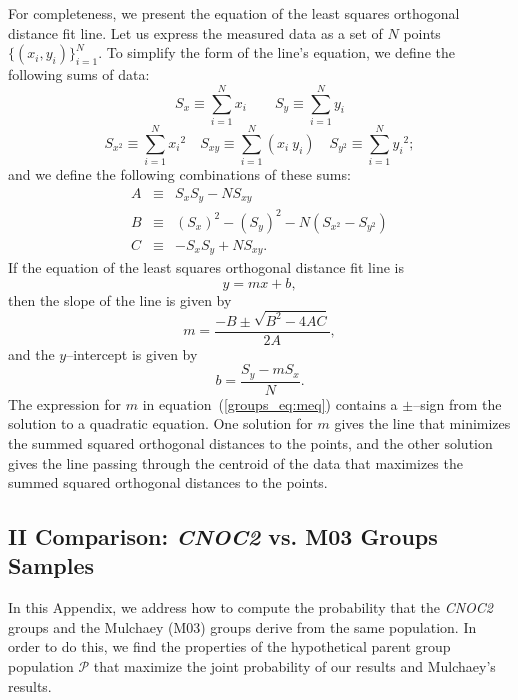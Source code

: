 For completeness, we present the equation of the least squares
orthogonal distance fit line.  Let us express the measured data as a
set of $N$ points $\{(x_i, y_i)\}_{i=1}^N$.  To simplify the form of
the line's equation, we define the following sums of data:
\[
S_x \equiv \sum_{i=1}^N x_i \qquad S_y \equiv \sum_{i=1}^N y_i
\]
\begin{equation}
\label{groups_eq:sums} S_{x^2} \equiv \sum_{i=1}^N {x_i}^2
 \quad S_{xy}  \equiv \sum_{i=1}^N (x_i \: y_i)
 \quad S_{y^2} \equiv \sum_{i=1}^N {y_i}^2;
\end{equation}
and we define the following combinations of these sums:
\begin{eqnarray}
\nonumber      A & \equiv & S_x S_y - NS_{xy}\\
\nonumber      B & \equiv & (S_x)^2 - (S_y)^2 - N(S_{x^2}-S_{y^2})\\
\label{groups_eq:ABC} C & \equiv & - S_x S_y + NS_{xy}.
\end{eqnarray}
If the equation of the least squares orthogonal distance fit line is
\begin{equation}
y = m x + b,
\label{groups_eq:basiclineeq}
\end{equation}
then the slope of the line is given by
\begin{equation}
m = \frac{-B \pm \sqrt{B^2 - 4AC}}{2A},
\label{groups_eq:meq}
\end{equation}
and the $y$--intercept is given by
\begin{equation}
b = \frac{S_y - m S_x}{N}.
\label{groups_eq:beq}
\end{equation}
The expression for $m$ in equation~(\ref{groups_eq:meq}) contains a
$\pm$--sign from the solution to a quadratic equation. One solution
for $m$ gives the line that minimizes the summed squared orthogonal
distances to the points, and the other solution gives the line passing
through the centroid of the data that maximizes the summed squared
orthogonal distances to the points.


\subsection*{II Comparison: \textsl{CNOC2} vs. M03 Groups Samples}
\label{appendixII}

In this Appendix, we address how to compute the probability that the
\textsl{CNOC2} groups and the Mulchaey (M03) groups derive from the same
population.  In order to do this, we find the properties of the hypothetical
parent group population $\mathcal{P}$ that maximize the joint probability of
our results and Mulchaey's results.

